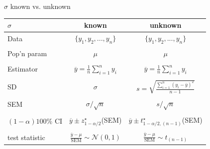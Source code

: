 \documentclass{beamer}\usepackage[]{graphicx}\usepackage[]{color}
\begin{document}
\begin{frame}{$\sigma$ known vs. unknown}
\begin{center}
	\begin{tabular}{|l|c|c|} \hline
		$\sigma$& known & unknown \\ \hline Data & $\{y_1,y_2,...,y_n\}$ &
		$\{y_1,y_2,...,y_n\}$\\
		& & \\
		Pop'n param & $\mu$ & $\mu$\\
		& & \\
		Estimator & $\overline{y} = \frac{1}{n}\sum_{i=1}^n y_i$ & $\overline{y} = \frac{1}{n}\sum_{i=1}^n y_i$ \\
		& & \\
		SD & $\sigma$ & $s = \sqrt{\frac{\sum_{i=1}^n(y_i-\overline{y})^2}{n-1}}$ \\
		& & \\
		SEM & $\sigma/\sqrt{n}$ & $s / \sqrt{n}$ \\
		& & \\
		$(1-\alpha)100$\% CI & $\overline{y} \pm z^\star_{1-\alpha/2}$(SEM) & $\overline{y} \pm t^\star_{1-\alpha/2, (n-1)}$(SEM) \\
		& & \\
		test statistic & $\frac{\overline{y}-\mu}{\textrm{SEM}}\sim \mathcal{N}(0,1)$ &
		$\frac{\overline{y}-\mu}{\textrm{SEM}}\sim t_{(n-1)}$ \\
		\hline
	\end{tabular}
\end{center}
\end{frame}
\end{document}
